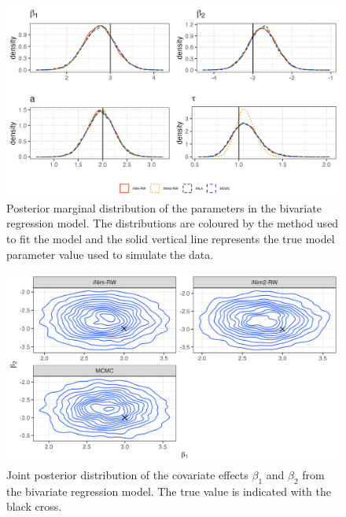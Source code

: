 \documentclass[
]{article}
\begin{document}
\begin{figure}

{\centering \includegraphics{results/bivariateRegression.png}

}

\caption{\label{fig-bivariatePlot}Posterior marginal distribution of the
parameters in the bivariate regression model. The distributions are
coloured by the method used to fit the model and the solid vertical line
represents the true model parameter value used to simulate the data.}

\end{figure}

\begin{figure}

{\centering \includegraphics{results/bivariateContour.png}

}

\caption{\label{fig-bivariateContour}Joint posterior distribution of the
covariate effects \(\beta_1\) and \(\beta_2\) from the bivariate
regression model. The true value is indicated with the black cross.}

\end{figure}
\end{document}
